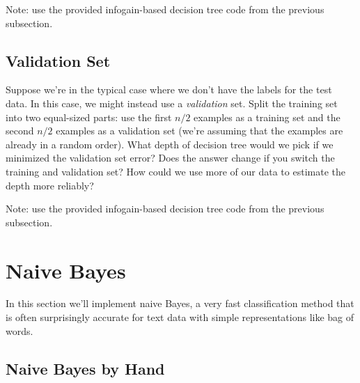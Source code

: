\documentclass{article}
\def\blu#1{{\color{blu}#1}}
\begin{document}
Note: use the provided infogain-based decision tree code from the previous subsection.



\subsection{Validation Set}

Suppose we're in the typical case where we don't have the labels for the test data. In this case, we might instead use a \emph{validation} set. Split the training set into two equal-sized parts: use the first $n/2$ examples as a training set and the second $n/2$ examples as a validation set (we're assuming that the examples are already in a random order). \blu{What depth of decision tree would we pick if we minimized the validation set error? Does the answer change if you switch the training and validation set? How could we use more of our data to  estimate the depth more reliably?}

Note: use the provided infogain-based decision tree code from the previous subsection.



\section{Naive Bayes}

In this section we'll implement naive Bayes, a very fast classification method that is often surprisingly accurate for text data with simple representations like bag of words.


\subsection{Naive Bayes by Hand}
\end{document}
